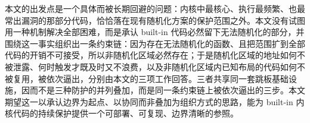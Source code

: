 本文的出发点是一个具体而被长期回避的问题：内核中最核心、执行最频繁、也最常出漏洞的那部分代码，恰恰落在现有随机化方案的保护范围之外。本文没有试图用一种机制解决全部困难，而是承认 built-in 代码必然留下无法随机化的部分，并围绕这一事实组织出一条约束链：因为存在无法随机化的函数、且把范围扩到全部代码的开销不可接受，所以非随机化区域必然存在；于是随机化区域的地址如何不被泄露、何时触发才既及时又不浪费，以及非随机化区域内已知布局的代码如何不被复用，被依次逼出，分别由本文的三项工作回答。三者共享同一套跳板基础设施，因而不是三种防护的并列叠加，而是同一条约束链上被依次逼出的三步。本文期望这一以承认边界为起点、以协同而非叠加为组织方式的思路，能为 built-in 内核代码的持续保护提供一个可部署、可复现、边界清晰的参照。

